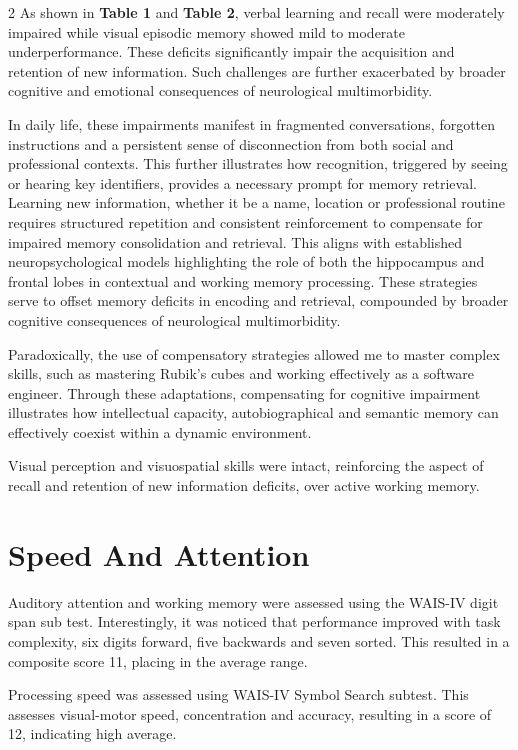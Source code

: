 \documentclass{article}
\begin{document}

\begin{multicols}{2}
As shown in \textbf{Table 1} and \textbf{Table 2}, verbal learning and recall were moderately impaired while visual episodic memory showed mild to moderate underperformance. These deficits significantly impair the acquisition and retention of new information. Such challenges are further exacerbated by broader cognitive and emotional consequences of neurological multimorbidity.

In daily life, these impairments manifest in fragmented conversations, forgotten instructions and a persistent sense of disconnection from both social and professional contexts. This further illustrates how recognition, triggered by seeing or hearing key identifiers, provides a necessary prompt for memory retrieval. Learning new information, whether it be a name, location or professional routine requires structured repetition and consistent reinforcement to compensate for impaired memory consolidation and retrieval. This aligns with established neuropsychological models highlighting the role of both the hippocampus and frontal lobes in contextual and working memory processing.\cite{eichenbaum2017,stuss2000} These strategies serve to offset memory deficits in encoding and retrieval, compounded by broader cognitive consequences of neurological multimorbidity.\cite{lezak2012,feinstein2011} 

Paradoxically, the use of compensatory strategies allowed me to master complex skills, such as mastering Rubik’s cubes and working effectively as a software engineer. Through these adaptations, compensating for cognitive impairment illustrates how intellectual capacity, autobiographical and semantic memory can effectively coexist within a dynamic environment.

Visual perception and visuospatial skills were intact, reinforcing the aspect of recall and retention of new information deficits, over active working memory.


\section*{Speed And Attention}
Auditory attention and working memory were assessed using the WAIS-IV digit span sub test. Interestingly, it was noticed that performance improved with task complexity, six digits forward, five backwards and seven sorted. This resulted in a composite score 11, placing in the average range.

Processing speed was assessed using WAIS-IV Symbol Search subtest. This assesses visual-motor speed, concentration and accuracy, resulting in a score of 12, indicating high average.


\end{multicols}
\end{document}
